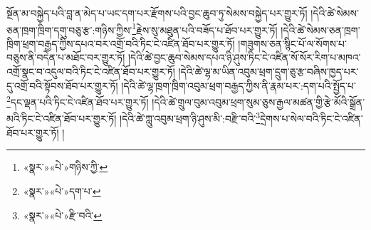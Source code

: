 སྔོན་མ་བསྐྱེད་པའི་བླ་ན་མེད་པ་ཡང་དག་པར་རྫོགས་པའི་བྱང་ཆུབ་ཏུ་སེམས་བསྐྱེད་པར་གྱུར་ཏོ། །དེའི་ཚེ་སེམས་ཅན་ཁྲག་ཁྲིག་དགུ་བཅུ་རྩ་:གཉིས་ཀྱིས་\footnote{«སྣར་»«པེ་»གཉིས་ཀྱི་}རྗེས་སུ་མཐུན་པའི་བཟོད་པ་ཐོབ་པར་གྱུར་ཏོ། །དེའི་ཚེ་སེམས་ཅན་ཁྲག་ཁྲིག་ཕྲག་བརྒྱད་ཀྱིས་དཔའ་བར་འགྲོ་བའི་ཏིང་ངེ་འཛིན་ཐོབ་པར་གྱུར་ཏོ། །གཟུགས་ཅན་སྙིང་པོ་ལ་སོགས་པ་བཅུས་ནི་བདེན་པ་མཐོང་བར་གྱུར་ཏོ། །དེའི་ཚེ་བྱང་ཆུབ་སེམས་དཔའ་ཉི་ཤུས་ཏིང་ངེ་འཛིན་སོ་སོར་རིག་པ་མཁའ་འགྲོ་སྣང་བ་འདུལ་བའི་ཏིང་ངེ་འཛིན་ཐོབ་པར་གྱུར་ཏོ། །དེའི་ཚེ་ལྷ་མ་ཡིན་འབུམ་ཕྲག་དྲུག་ཅུ་རྩ་བཞིས་ཁྱད་པར་དུ་འགྲོ་བའི་སྟོབས་ཐོབ་པར་གྱུར་ཏོ། །དེའི་ཚེ་ལྷ་ཁྲག་ཁྲིག་འབུམ་ཕྲག་བརྒྱད་ཀྱིས་ནི་རྣམ་པར་:དག་པའི་སྤྱོད་པ་\footnote{«སྣར་»«པེ་»དག་པ་}དང་ལྡན་པའི་ཏིང་ངེ་འཛིན་ཐོབ་པར་གྱུར་ཏོ། །དེའི་ཚེ་གྲུལ་བུམ་འབུམ་ཕྲག་སུམ་ཅུས་རྒྱལ་མཚན་གྱི་རྩེ་མོའི་སྒྲོན་མའི་ཏིང་ངེ་འཛིན་ཐོབ་པར་གྱུར་ཏོ། །དེའི་ཚེ་ཀླུ་འབུམ་ཕྲག་ཉི་ཤུས་མི་:བརྫི་བའི་\footnote{«སྣར་»«པེ་»རྫི་བའི་}དྲེགས་པ་སེལ་བའི་ཏིང་ངེ་འཛིན་ཐོབ་པར་གྱུར་ཏོ། །
